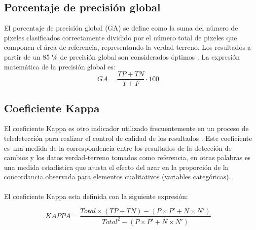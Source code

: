 \subsection{Porcentaje de precisi\'on global}\label{sec:pg}
El porcentaje de precisi\'on global (GA) se define como la suma del n\'umero de pixeles clasificados correctamente dividido por el n\'umero total de pixeles que componen el \'area de referencia, representando la verdad terreno. Los resultados a partir de un 85 \% de precisi\'on global son considerados \'optimos \cite{foody2002status}. La expresi\'on matem\'atica de la precisi\'on global es:
		\begin{equation}
		GA = \frac{TP+TN}{T+F}\cdot100
		\end{equation}
\subsection{Coeficiente Kappa}\label{sec:kappa}
El coeficiente Kappa es otro indicador utilizado frecuentemente en un proceso de teledetecci\'on para realizar el control de calidad de los resultados \cite{chuvieco1998factor}. Este coeficiente es una medida de la correspondencia entre los resultados de la detecci\'on de cambios y los datos verdad-terreno tomados como referencia, en otras palabras es una medida estad\'istica que ajusta el efecto del azar en la proporci\'on de la concordancia observada para elementos cualitativos (variables categ\'oricas).\\~\\
El coeficiente Kappa esta definida con la siguiente expresi\'on:

		\begin{equation}
		KAPPA=\dfrac{Total \times (TP+TN)-(P \times P'+N \times N')}{Total^{2} - (P \times P'+N \times N')}
		\end{equation}
		
